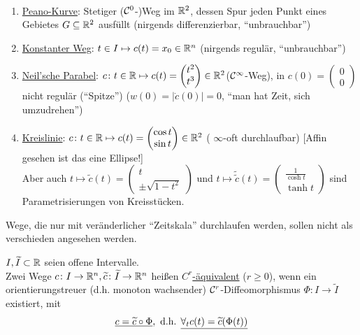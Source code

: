 \begin{bsp}\(\)
\begin{enumerate}
 \item \uline{Peano-Kurve}: Stetiger (\(\mathcal{C}^0\)-)Weg im \(\mathbb{R}^2\), dessen Spur jeden Punkt eines Gebietes \(G\subseteq \mathbb{R}^2\) ausfüllt (nirgends differenzierbar, "`unbrauchbar"')
 \item \uline{Konstanter Weg}: \(t \in I \mapsto c(t)=x_0 \in \mathbb{R}^n\) (nirgends regulär, "`unbrauchbar"')
 \item \uline{Neil'sche Parabel}: \(c \colon t\in \mathbb{R} \mapsto c(t) = \begin{pmatrix}
                                                                t^2 \\
								t^3
                                                               \end{pmatrix}
								\in \mathbb{R}^2 \)\quad (\(\mathcal{C}^\infty\)-Weg), in \(c(0)=\begin{pmatrix}
								                                                  0 \\
														  0
								                                                 \end{pmatrix} \) nicht regulär ("`Spitze"') (\(w(0)=|\dot c (0)|=0\), "`man hat Zeit, sich umzudrehen"')
 \item \uline{Kreislinie}: \(c\colon t\in \mathbb{R} \mapsto c(t)=\begin{pmatrix}
                                                       \cos t \\
						       \sin t
                                                      \end{pmatrix} \in \mathbb{R}^2\) ( \(\infty\)-oft durchlaufbar) [Affin gesehen ist das eine Ellipse!] \\
Aber auch \(t \mapsto \widetilde c(t) = \begin{pmatrix}
                                     t \\
				     \pm \sqrt{1-t^2}
                                    \end{pmatrix} \) und \(t \mapsto \widetilde{\widetilde c}(t)=\begin{pmatrix}
											  \frac{1}{\cosh t} \\
											  \tanh t
											 \end{pmatrix} \)
sind Parametrisierungen von Kreisstücken.
\end{enumerate}
\end{bsp}
Wege,  die nur mit veränderlicher "`Zeitskala"' durchlaufen werden, sollen nicht als verschieden angesehen werden.
\begin{definition}
 \(I, \widetilde I \subset \mathbb{R}\) seien offene Intervalle. \\
Zwei Wege \(c \colon I \to \mathbb{R}^n, \widetilde c \colon \widetilde I \to \mathbb{R}^n\) heißen \uline{\(C^r\)-äquivalent} (\(r\ge 0 \)), wenn ein orientierungstreuer (d.h. monoton wachsender) \(\mathcal{C}^r\)-Diffeomorphismus \(\Phi \colon I \to \widetilde I\) existiert, mit
\[
 \uline{c= \widetilde c \circ \Phi}, \text{ d.h. } \uline{\forall_t c(t)=\widetilde c (\Phi(t))}
\]

\end{definition}


